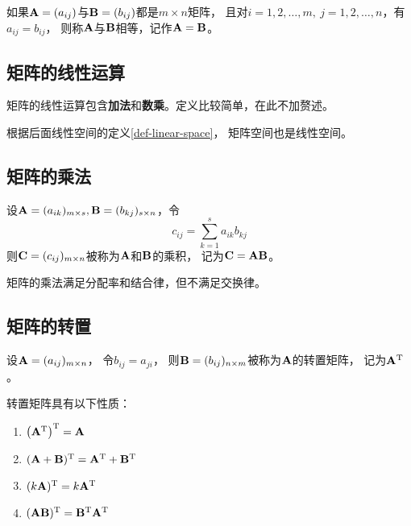 \begin{definition}[矩阵相等]
  如果$\mathbf{A}=(a_{ij})$与$\mathbf{B}=(b_{ij})$都是$m\times n$矩阵，
  且对$i=1,2,\dots,m,\ j=1,2,\dots,n$，有$a_{ij}=b_{ij}$，
  则称$\mathbf{A}$与$\mathbf{B}$相等，记作$\mathbf{A}=\mathbf{B}$。
\end{definition}

\subsection{矩阵的线性运算}
矩阵的线性运算包含\textbf{加法}和\textbf{数乘}。定义比较简单，在此不加赘述。

根据后面线性空间的定义\ref{def-linear-space}，
矩阵空间也是线性空间。

\subsection{矩阵的乘法}
\begin{definition}[矩阵的乘法]
  设$\mathbf{A}=(a_{ik})_{m\times s}, \mathbf{B}=(b_{kj})_{s\times n}$，令
  \begin{equation}
  c_{ij}=\sum_{k=1}^{s}a_{ik}b_{kj}
  \end{equation}
  则$\mathbf{C}=(c_{ij})_{m\times n}$被称为$\mathbf{A}$和$\mathbf{B}$的乘积，
  记为$\mathbf{C} = \mathbf{A}\mathbf{B}$。
\end{definition}

矩阵的乘法满足分配率和结合律，但不满足交换律。

\subsection{矩阵的转置}
\begin{definition}[矩阵的转置]
  设$\mathbf{A}=(a_{ij})_{m\times n}$，
  令$b_{ij}=a_{ji}$，
  则$\mathbf{B}=(b_{ij})_{n\times m}$被称为$\mathbf{A}$的转置矩阵，
  记为$\mathbf{A}^{\textrm{T}}$。
\end{definition}

\begin{theorem}[转置矩阵的性质]
  转置矩阵具有以下性质：
  \begin{enumerate}
    \item $\left(\mathbf{A}^{\textrm{T}}\right)^{\textrm{T}} = \mathbf{A}$
    \item $(\mathbf{A}+\mathbf{B})^{\textrm{T}}=\mathbf{A}^{\textrm{T}} + \mathbf{B}^{\textrm{T}}$
    \item $(k\mathbf{A})^{\textrm{T}}=k\mathbf{A}^{\textrm{T}}$
    \item $(\mathbf{A}\mathbf{B})^{\textrm{T}}=\mathbf{B}^{\textrm{T}}\mathbf{A}^{\textrm{T}}$
  \end{enumerate}
\end{theorem}

